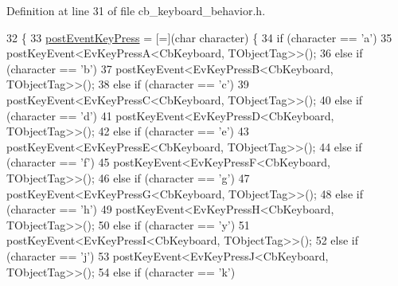 Definition at line 31 of file cb\+\_\+keyboard\+\_\+behavior.\+h.


\begin{DoxyCode}
32         \{
33                 \hyperlink{classsm__three__some_1_1keyboard__client_1_1CbKeyboard_af6666ca56b24512b936cea525c18f0fc}{postEventKeyPress} = [=](\textcolor{keywordtype}{char} character) \{
34                         \textcolor{keywordflow}{if} (character == \textcolor{charliteral}{'a'})
35                                 postKeyEvent<EvKeyPressA<CbKeyboard, TObjectTag>>();
36                         \textcolor{keywordflow}{else} \textcolor{keywordflow}{if} (character == \textcolor{charliteral}{'b'})
37                                 postKeyEvent<EvKeyPressB<CbKeyboard, TObjectTag>>();
38                         \textcolor{keywordflow}{else} \textcolor{keywordflow}{if} (character == \textcolor{charliteral}{'c'})
39                                 postKeyEvent<EvKeyPressC<CbKeyboard, TObjectTag>>();
40                         \textcolor{keywordflow}{else} \textcolor{keywordflow}{if} (character == \textcolor{charliteral}{'d'})
41                                 postKeyEvent<EvKeyPressD<CbKeyboard, TObjectTag>>();
42                         \textcolor{keywordflow}{else} \textcolor{keywordflow}{if} (character == \textcolor{charliteral}{'e'})
43                                 postKeyEvent<EvKeyPressE<CbKeyboard, TObjectTag>>();
44                         \textcolor{keywordflow}{else} \textcolor{keywordflow}{if} (character == \textcolor{charliteral}{'f'})
45                                 postKeyEvent<EvKeyPressF<CbKeyboard, TObjectTag>>();
46                         \textcolor{keywordflow}{else} \textcolor{keywordflow}{if} (character == \textcolor{charliteral}{'g'})
47                                 postKeyEvent<EvKeyPressG<CbKeyboard, TObjectTag>>();
48                         \textcolor{keywordflow}{else} \textcolor{keywordflow}{if} (character == \textcolor{charliteral}{'h'})
49                                 postKeyEvent<EvKeyPressH<CbKeyboard, TObjectTag>>();
50                         \textcolor{keywordflow}{else} \textcolor{keywordflow}{if} (character == \textcolor{charliteral}{'y'})
51                                 postKeyEvent<EvKeyPressI<CbKeyboard, TObjectTag>>();
52                         \textcolor{keywordflow}{else} \textcolor{keywordflow}{if} (character == \textcolor{charliteral}{'j'})
53                                 postKeyEvent<EvKeyPressJ<CbKeyboard, TObjectTag>>();
54                         \textcolor{keywordflow}{else} \textcolor{keywordflow}{if} (character == \textcolor{charliteral}{'k'})

\end{DoxyCode}

